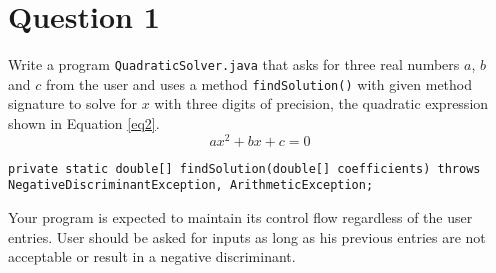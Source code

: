 \section*{Question 1}

Write a program \texttt{QuadraticSolver.java} that asks for three real numbers $a$, $b$ and $c$ from the user and uses a method \texttt{findSolution()} with given method signature to solve for $x$ with three digits of precision, the quadratic expression shown in Equation \ref{eq2}.
\begin{equation}
ax^2+bx+c=0
\label{eq2}
\end{equation}

\lstset{language=java,tabsize=2,numbers=none}
\begin{lstlisting}
private static double[] findSolution(double[] coefficients) throws NegativeDiscriminantException, ArithmeticException;
\end{lstlisting}

Your program is expected to maintain its control flow regardless of the user entries. User should be asked for inputs as long as his previous entries are not acceptable or result in a negative discriminant.